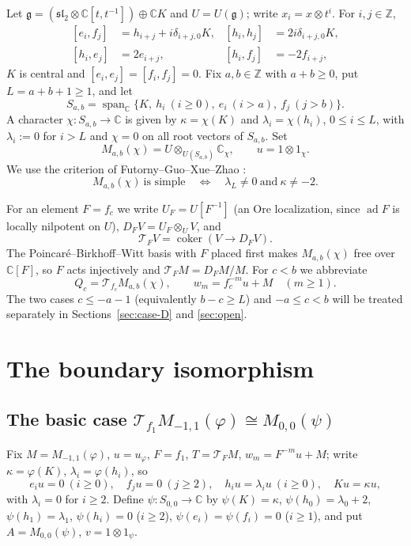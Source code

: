 \documentclass[11pt,a4paper]{article}
\newcommand{\C}{\mathbb C}
\newcommand{\Z}{\mathbb Z}
\newcommand{\g}{\mathfrak g}
\newcommand{\slc}{\mathfrak{sl}_2}
\newcommand{\ad}{\operatorname{ad}}
\newcommand{\Span}{\operatorname{span}_{\C}}
\newcommand{\T}{\mathcal T}
\begin{document}
Let $\g=(\slc\otimes\C[t,t^{-1}])\oplus\C K$ and $U=U(\g)$; write
$x_i=x\otimes t^i$. For $i,j\in\Z$,
\begin{equation}\label{eq:brackets}
\begin{aligned}
 [e_i,f_j]&=h_{i+j}+i\delta_{i+j,0}K,&
 [h_i,h_j]&=2i\delta_{i+j,0}K,\\
 [h_i,e_j]&=2e_{i+j},&
 [h_i,f_j]&=-2f_{i+j},
\end{aligned}
\end{equation}
$K$ is central and $[e_i,e_j]=[f_i,f_j]=0$. Fix $a,b\in\Z$ with
$a+b\ge0$, put $L=a+b+1\ge1$, and let
\[
 S_{a,b}=\Span\{K,\ h_i\ (i\ge0),\ e_i\ (i>a),\ f_j\ (j>b)\}.
\]
A character $\chi:S_{a,b}\to\C$ is given by $\kappa=\chi(K)$ and
$\lambda_i=\chi(h_i)$, $0\le i\le L$, with $\lambda_i:=0$ for $i>L$ and
$\chi=0$ on all root vectors of $S_{a,b}$. Set
\[
 M_{a,b}(\chi)=U\otimes_{U(S_{a,b})}\C_\chi,\qquad u=1\otimes1_\chi.
\]
We use the criterion of Futorny--Guo--Xue--Zhao \cite[Theorem 1.1]{FGXZ}:
\begin{equation}\label{eq:FGXZ}
 M_{a,b}(\chi)\ \text{is simple}\quad\Longleftrightarrow\quad
 \lambda_L\ne0\ \text{and}\ \kappa\ne-2.
\end{equation}

For an element $F=f_c$ we write $U_F=U[F^{-1}]$ (an Ore localization, since
$\ad F$ is locally nilpotent on $U$), $D_FV=U_F\otimes_UV$, and
\begin{equation}\label{eq:TF}
 \T_FV=\operatorname{coker}(V\to D_FV).
\end{equation}
The Poincar\'e--Birkhoff--Witt basis with $F$ placed first makes
$M_{a,b}(\chi)$ free over $\C[F]$, so $F$ acts injectively and
$\T_FM=D_FM/M$. For $c<b$ we abbreviate
\[
 Q_c=\T_{f_c}M_{a,b}(\chi),\qquad w_m=f_c^{-m}u+M\quad(m\ge1).
\]
The two cases $c\le-a-1$ (equivalently $b-c\ge L$) and $-a\le c<b$ will
be treated separately in Sections~\ref{sec:case-D} and \ref{sec:open}.

\section{The boundary isomorphism}
\label{sec:boundary}

\subsection{The basic case \texorpdfstring{$\T_{f_1}M_{-1,1}(\varphi)\cong M_{0,0}(\psi)$}{basic}}

Fix $M=M_{-1,1}(\varphi)$, $u=u_\varphi$, $F=f_1$, $T=\T_FM$,
$w_m=F^{-m}u+M$; write $\kappa=\varphi(K)$, $\lambda_i=\varphi(h_i)$, so
\begin{equation}\label{eq:cyclic}
 e_iu=0\ (i\ge0),\quad f_ju=0\ (j\ge2),\quad h_iu=\lambda_iu\ (i\ge0),
 \quad Ku=\kappa u,
\end{equation}
with $\lambda_i=0$ for $i\ge2$. Define $\psi:S_{0,0}\to\C$ by
$\psi(K)=\kappa$, $\psi(h_0)=\lambda_0+2$, $\psi(h_1)=\lambda_1$,
$\psi(h_i)=0$ ($i\ge2$), $\psi(e_i)=\psi(f_i)=0$ ($i\ge1$), and put
$A=M_{0,0}(\psi)$, $v=1\otimes1_\psi$.
\end{document}
